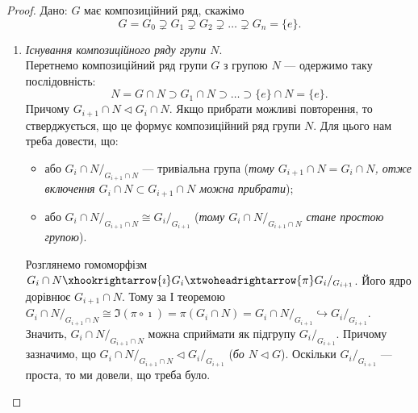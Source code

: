 \documentclass{math_library}
\begin{document}
\begin{proof}
\rightproof Дано: $G$ має композиційний ряд, скажімо
\[
G = G_0 \supsetneq G_1 \supsetneq G_2 \supsetneq \dots \supsetneq G_n = \{e\}.
\]
\begin{enumerate}[wide=0pt,label={\Roman*.}]
\item \textit{Існування композиційного ряду групи $N$}.\\
Перетнемо композиційний ряд групи $G$ з групою $N$ --- одержимо таку послідовність:
\[
N = G \cap N \supset G_1 \cap N \supset \dots \supset \{e\} \cap N = \{e\}.
\]
Причому $G_{i+1} \cap N \triangleleft G_i \cap N$. Якщо прибрати можливі повторення, то стверджується, що це формує композиційний ряд групи $N$. Для цього нам треба довести, що:
\begin{itemize}[nosep]
\item або ${G_i \cap N}/_{G_{i+1} \cap N}$ --- тривіальна група (\textit{тому $G_{i+1} \cap N = G_i \cap N$, отже включення $G_{i} \cap N \subset G_{i+1} \cap N$ можна прибрати});
\item або ${G_i \cap N}/_{G_{i+1} \cap N} \cong {G_i}/_{G_{i+1}}$ (\textit{тому ${G_i \cap N}/_{G_{i+1} \cap N}$ стане простою групою}).
\end{itemize}
Розглянемо гомоморфізм $G_i \cap N \xhookrightarrow{\imath} G_i \xtwoheadrightarrow{\pi} G_i/_{G_{i+1}}$. Його ядро дорівнює $G_{i+1} \cap N$. Тому за І теоремою ${G_i \cap N}/_{G_{i+1} \cap N} \cong \Im ( \pi \circ \imath) = \pi(G_i \cap N) = {G_i \cap N}/_{G_{i+1}}  \hookrightarrow G_i/_{G_{i+1}}$. Значить, ${G_i \cap N}/_{G_{i+1} \cap N}$ можна сприймати як підгрупу ${G_i}/_{G_{i+1}}$. Причому зазначимо, що ${G_i \cap N}/_{G_{i+1} \cap N} \triangleleft {G_i}/_{G_{i+1}}$ (\textit{бо $N \triangleleft G$}). Оскільки ${G_i}/_{G_{i+1}}$ --- проста, то ми довели, що треба було.


\end{enumerate}
\end{proof}
\end{document}
